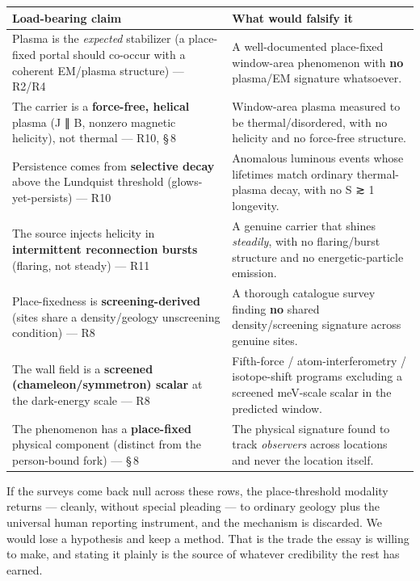 \documentclass[11pt]{article}
\begin{document}
\begin{center}\footnotesize\setlength{\tabcolsep}{4pt}
\begin{tabular}{>{\raggedright\arraybackslash}p{} >{\raggedright\arraybackslash}p{}}
\toprule
\textbf{Load-bearing claim} & \textbf{What would falsify it}\\ \midrule
Plasma is the \emph{expected} stabilizer (a place-fixed portal should co-occur with a coherent EM/plasma structure) --- R2/R4 & A well-documented place-fixed window-area phenomenon with \textbf{no} plasma/EM signature whatsoever.\\
The carrier is a \textbf{force-free, helical} plasma (J ∥ B, nonzero magnetic helicity), not thermal --- R10, \S\,8 & Window-area plasma measured to be thermal/disordered, with no helicity and no force-free structure.\\
Persistence comes from \textbf{selective decay} above the Lundquist threshold (glows-yet-persists) --- R10 & Anomalous luminous events whose lifetimes match ordinary thermal-plasma decay, with no S ≳ 1 longevity.\\
The source injects helicity in \textbf{intermittent reconnection bursts} (flaring, not steady) --- R11 & A genuine carrier that shines \emph{steadily}, with no flaring/burst structure and no energetic-particle emission.\\
Place-fixedness is \textbf{screening-derived} (sites share a density/geology unscreening condition) --- R8 & A thorough catalogue survey finding \textbf{no} shared density/screening signature across genuine sites.\\
The wall field is a \textbf{screened (chameleon/symmetron) scalar} at the dark-energy scale --- R8 & Fifth-force / atom-interferometry / isotope-shift programs excluding a screened meV-scale scalar in the predicted window.\\
The phenomenon has a \textbf{place-fixed} physical component (distinct from the person-bound fork) --- \S\,8 & The physical signature found to track \emph{observers} across locations and never the location itself.\\
\bottomrule\end{tabular}\end{center}

If the surveys come back null across these rows, the place-threshold modality returns --- cleanly, without special pleading --- to ordinary geology plus the universal human reporting instrument, and the mechanism is discarded. We would lose a hypothesis and keep a method. That is the trade the essay is willing to make, and stating it plainly is the source of whatever credibility the rest has earned.
\end{document}
